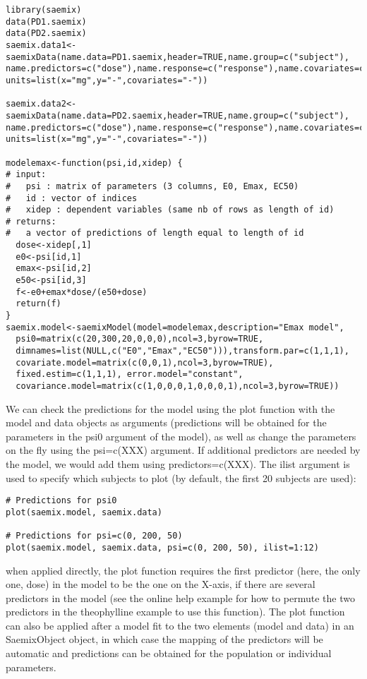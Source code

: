 {\begin{verbatim}
library(saemix)
data(PD1.saemix)
data(PD2.saemix)
saemix.data1<-saemixData(name.data=PD1.saemix,header=TRUE,name.group=c("subject"), 
name.predictors=c("dose"),name.response=c("response"),name.covariates=c("gender"), 
units=list(x="mg",y="-",covariates="-"))

saemix.data2<-saemixData(name.data=PD2.saemix,header=TRUE,name.group=c("subject"), 
name.predictors=c("dose"),name.response=c("response"),name.covariates=c("gender"), 
units=list(x="mg",y="-",covariates="-"))

modelemax<-function(psi,id,xidep) {
# input:
#   psi : matrix of parameters (3 columns, E0, Emax, EC50)
#   id : vector of indices 
#   xidep : dependent variables (same nb of rows as length of id)
# returns:
#   a vector of predictions of length equal to length of id
  dose<-xidep[,1]
  e0<-psi[id,1]
  emax<-psi[id,2]
  e50<-psi[id,3]
  f<-e0+emax*dose/(e50+dose)
  return(f)
}
saemix.model<-saemixModel(model=modelemax,description="Emax model", 
  psi0=matrix(c(20,300,20,0,0,0),ncol=3,byrow=TRUE,
  dimnames=list(NULL,c("E0","Emax","EC50"))),transform.par=c(1,1,1), 
  covariate.model=matrix(c(0,0,1),ncol=3,byrow=TRUE), 
  fixed.estim=c(1,1,1), error.model="constant",
  covariance.model=matrix(c(1,0,0,0,1,0,0,0,1),ncol=3,byrow=TRUE))
\end{verbatim}
We can check the predictions for the model using the plot function with the model and data objects as arguments (predictions will be obtained for the parameters in the {\sf psi0} argument of the model), as well as change the parameters on the fly using the {\sf psi=c(XXX)} argument. If additional predictors are needed by the model, we would add them using {\sf predictors=c(XXX)}. The {\sf ilist} argument is used to specify which subjects to plot (by default, the first 20 subjects are used):
\begin{verbatim}
# Predictions for psi0
plot(saemix.model, saemix.data)

# Predictions for psi=c(0, 200, 50)
plot(saemix.model, saemix.data, psi=c(0, 200, 50), ilist=1:12)
\end{verbatim}
 when applied directly, the {\sf plot} function requires the first predictor (here, the only one, dose) in the model to be the one on the X-axis, if there are several predictors in the model (see the online help example for how to permute the two predictors in the theophylline example to use this function). The {\sf plot} function can also be applied after a model fit to the two elements (model and data) in an SaemixObject object, in which case the mapping of the predictors will be automatic and predictions can be obtained for the population or individual parameters.

}
